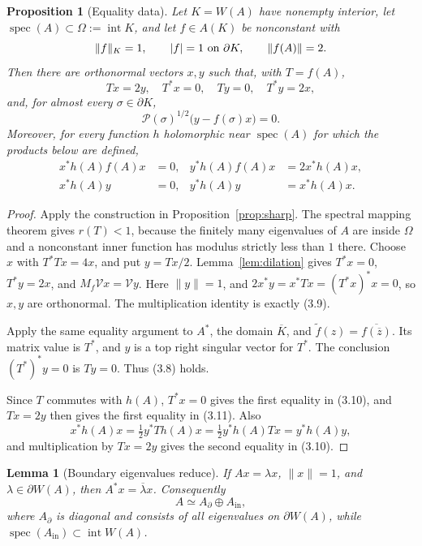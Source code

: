 \documentclass[11pt]{article}
\newtheorem{lemma}[theorem]{Lemma}
\newtheorem{proposition}[theorem]{Proposition}
\theoremstyle{definition}
\theoremstyle{remark}
\newcommand{\spec}{\operatorname{spec}}
\newcommand{\Int}{\operatorname{int}}
\begin{document}
\begin{proposition}[Equality data]\label{prop:equality-data}
Let \(K=W(A)\) have nonempty interior, let \(\spec(A)\subset\Omega:=\Int K\),
and let \(f\in A(K)\) be nonconstant with
\[
 \|f\|_K=1,\qquad |f|=1\ \hbox{on }\partial K,\qquad \|f(A)\|=2.
\]
Then there are orthonormal vectors \(x,y\) such that, with \(T=f(A)\),
\[
 Tx=2y,\quad T^*x=0,\quad Ty=0,\quad T^*y=2x,         \tag{3.8}
\]
and, for almost every \(\sigma\in\partial K\),
\[
 \mathcal P(\sigma)^{1/2}\bigl(y-f(\sigma)x\bigr)=0.  \tag{3.9}
\]
Moreover, for every function \(h\) holomorphic near \(\spec(A)\) for which
the products below are defined,
\begin{align}
 x^*h(A)f(A)x&=0,& y^*h(A)f(A)x&=2x^*h(A)x,\tag{3.10}\\
 x^*h(A)y&=0,& y^*h(A)y&=x^*h(A)x.             \tag{3.11}
\end{align}
\end{proposition}

\begin{proof}
Apply the construction in Proposition~\ref{prop:sharp}.  The spectral mapping
theorem gives \(r(T)<1\), because the finitely many eigenvalues of \(A\) are
inside \(\Omega\) and a nonconstant inner function has modulus strictly less
than \(1\) there.  Choose \(x\) with \(T^*Tx=4x\), and put \(y=Tx/2\).
Lemma~\ref{lem:dilation} gives \(T^*x=0\), \(T^*y=2x\), and
\(M_f\mathcal Vx=\mathcal Vy\).  Here \(\|y\|=1\), and
\(2x^*y=x^*Tx=(T^*x)^*x=0\), so \(x,y\) are orthonormal.
The multiplication identity is exactly (3.9).

Apply the same equality argument to \(A^*\), the domain \(\overline K\), and
\(\widetilde f(z)=\overline{f(\overline z)}\).  Its matrix value is \(T^*\),
and \(y\) is a top right singular vector for \(T^*\).  The conclusion
\((T^*)^*y=0\) is \(Ty=0\).  Thus (3.8) holds.

Since \(T\) commutes with \(h(A)\), \(T^*x=0\) gives the first equality in
(3.10), and \(Tx=2y\) then gives the first equality in (3.11).  Also
\[
 x^*h(A)x=\tfrac12y^*Th(A)x
          =\tfrac12y^*h(A)Tx=y^*h(A)y,
\]
and multiplication by \(Tx=2y\) gives the second equality in (3.10).
\end{proof}


\begin{lemma}[Boundary eigenvalues reduce]\label{lem:boundary-eigen}
If \(Ax=\lambda x\), \(\|x\|=1\), and \(\lambda\in\partial W(A)\), then
\(A^*x=\overline\lambda x\).  Consequently
\[
 A\simeq A_{\partial}\oplus A_{\mathrm{in}},
\]
where \(A_{\partial}\) is diagonal and consists of all eigenvalues on
\(\partial W(A)\), while
\(\spec(A_{\mathrm{in}})\subset\Int W(A)\).
\end{lemma}
\end{document}
